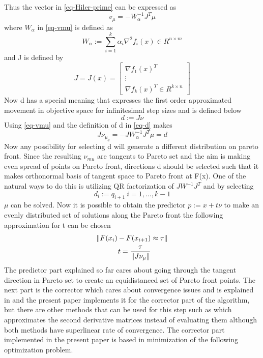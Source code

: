 \documentclass[12pt,a4paper]{article}
\DeclarePairedDelimiter{\norm}{\lVert}{\rVert}
\numberwithin{equation}{section}
\begin{document}
Thus the vector in \ref{eq-Hiler-prime} can be expressed as
\begin{equation} \label{eq-vmu}
v_{\mu}=-W^{-1}_{\alpha}J^{T}\mu 
\end{equation}
where $W_\alpha$ in \eqref{eq-vmu} is defined as
\begin{equation}
W_\alpha:=\sum_{i=1}^{k}\alpha_{i}\nabla^{2}f_{i}(x) \in R^{n\times m} 
\end{equation}
and J is defined by
\begin{equation}
J=J(x)=\begin{bmatrix}
\nabla f_{1}(x)^{T} \\
\vdots  \\
\nabla f_{k}(x)^{T}  \in R^{k \times n}
\end{bmatrix}
\end{equation}
Now d has a special meaning that expresses the first order approximated movement in objective space for infinitesimal step sizes and is defined below
\begin{equation}  \label{eq-d}
d:=J\nu
\end{equation}
Using \eqref{eq-vmu} and the definition of d in \eqref{eq-d} makes
\begin{equation}  \label{eq-jmuIsD}
J\nu_{\mu_{d}}=-JW^{-1}_{\alpha}J^{T}\mu=d
\end{equation} 
Now any possibility for selecting d will generate a different distribution on pareto front. Since the resulting $\nu_{mu}$ are tangents to Pareto set and the aim is making even spread of points on Pareto front, directions d should be selected such that it makes orthonormal basis of tangent space to Pareto front at F(x). One of the natural ways to do this is utilizing QR factorization of $JW^{-1}J^{T}$ and by selecting 
\begin{equation}
d_{i}:=q_{i+1}  \  i=1,\hdots,k-1
\end{equation}
$\mu$ can be solved. Now it is possible to obtain the predictor $p:=x+t\nu$ to make an evenly distributed set of solutions along the Pareto front the following approximation for t can be chosen
\begin{equation}
\begin{split}
\norm{F(x_{i})-F(x_{i+1}) &\approx \tau}  \\
t=\frac{\tau}{\norm{J\nu_{\mu}}}
\end{split}
\end{equation} 
The predictor part explained so far cares about going through the tangent direction in Pareto set to create an equidistanced set of Pareto front points. The next part is the corrector which cares about convergence issues and is explained in \citep{Fliege2009}and the present paper implements it for the corrector part of the algorithm, but there are other methods that can be used for this step such as \citep{Povalej2014}   which approximates the second derivative matrices instead of evaluating them although both methods have superlinear rate of convergence. The corrector part implemented in the present paper is based in minimization of the following optimization problem.
\end{document}
